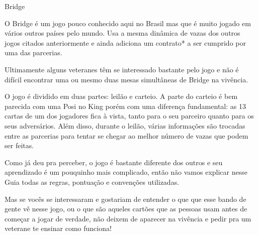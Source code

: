 \begin{subsecao}{Bridge}

O Bridge é um jogo pouco conhecido aqui no Brasil mas que é muito jogado em
vários outros países pelo mundo. Usa a mesma dinâmica de vazas dos outros jogos
citados anteriormente e ainda adiciona um contrato* a ser cumprido por uma das
parcerias.

Ultimamente alguns veteranes têm se interessado bastante pelo jogo e não é
difícil encontrar uma ou mesmo duas mesas simultâneas de Bridge na vivência.

O jogo é dividido em duas partes: leilão e carteio. A parte do carteio é bem
parecida com uma Posi no King porém com uma diferença fundamental: as 13 cartas
de um dos jogadores fica à vista, tanto para o seu parceiro quanto para os seus
adversários. Além disso, durante o leilão, várias informações são trocadas entre
as parcerias para tentar se chegar ao melhor número de vazas que podem ser
feitas.

Como já deu pra perceber, o jogo é bastante diferente dos outros e seu
aprendizado é um pouquinho mais complicado, então não vamos explicar nesse Guia
todas as regras, pontuação e convenções utilizadas.

Mas se vocês se interessaram e gostariam de entender o que que esse bando de
gente vê nesse jogo, ou o que são aqueles cartões que as pessoas usam antes de
começar a jogar de verdade, não deixem de aparecer na vivência e pedir pra um
veterane te ensinar como funciona!

\end{subsecao}
